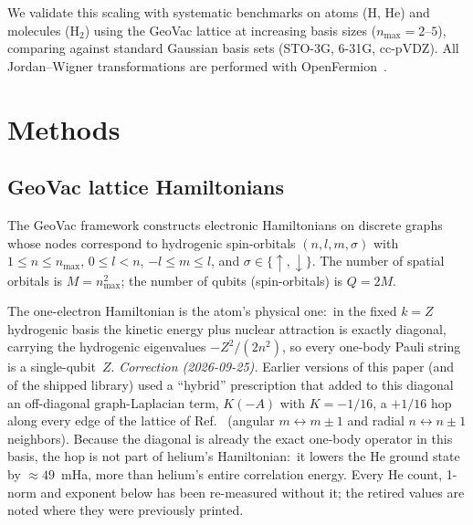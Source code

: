 \documentclass[aps,pra,twocolumn,superscriptaddress,longbibliography]{revtex4-2}
\begin{document}
We validate this scaling with systematic benchmarks on atoms (H, He) and
molecules (H$_2$) using the GeoVac lattice at increasing basis sizes
($n_{\max} = 2$--$5$), comparing against standard Gaussian basis sets
(STO-3G, 6-31G, cc-pVDZ).  All Jordan--Wigner transformations are
performed with OpenFermion~\cite{mcclean2020}.


\section{Methods}
\label{sec:methods}

\subsection{GeoVac lattice Hamiltonians}
\label{sec:geovac}

The GeoVac framework constructs electronic Hamiltonians on discrete graphs
whose nodes correspond to hydrogenic spin-orbitals $(n, l, m, \sigma)$
with $1 \le n \le n_{\max}$, $0 \le l < n$, $-l \le m \le l$, and
$\sigma \in \{\uparrow, \downarrow\}$.  The number of spatial orbitals is
$M = n_{\max}^2$; the number of qubits (spin-orbitals) is $Q = 2M$.

The one-electron Hamiltonian is the atom's physical one:\ in the fixed
$k = Z$ hydrogenic basis the kinetic energy plus nuclear attraction is
exactly diagonal, carrying the hydrogenic eigenvalues $-Z^2/(2n^2)$, so
every one-body Pauli string is a single-qubit~$Z$.
\emph{Correction (2026-09-25).}  Earlier versions of this paper (and of
the shipped library) used a ``hybrid'' prescription that added to this
diagonal an off-diagonal graph-Laplacian term, $K(-A)$ with
$K = -1/16$, a $+1/16$ hop along every edge of the lattice
of Ref.~\cite{loutey_paper7} (angular $m \leftrightarrow m \pm 1$ and
radial $n \leftrightarrow n \pm 1$ neighbors).  Because the diagonal is
already the exact one-body operator in this basis, the hop is not part of
helium's Hamiltonian:\ it lowers the He ground state by $\approx 49$~mHa,
more than helium's entire correlation energy.  Every He count, 1-norm and
exponent below has been re-measured without it; the retired values are
noted where they were previously printed.
\end{document}
